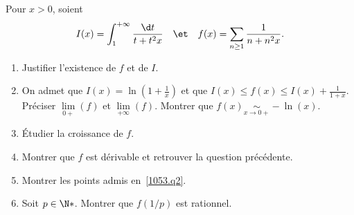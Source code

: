 \begin{enonce}
\begin{exercise}[ID={RMS125 E1053},subtitle={2014 CCP PC},tags={}]
    Pour $x>0$, soient 
    \begin{equation*}
    I(x)=\int_1^{+\infty} \frac{\d t}{t + t^2x}
    \quad\et\quad
    f(x)=\sum_{n\geq1} \frac{1}{n+n^2x}.  
    \end{equation*}
    \begin{enumerate}
      \item Justifier l'existence de $f$ et de $I$.
      \item\label{1053.q2}
        On admet que $I(x)=\ln\left( 1+\frac1x \right)$ et que $I(x)\leq f(x)\leq I(x)+ \frac{1}{1+x}$.\\
        Préciser $\lim\limits_{0+}(f)$ et $\lim\limits_{+\infty}(f)$.
        Montrer que $f(x)\underset{x\to0+}\sim -\ln(x)$.

      \item Étudier la croissance de $f$.
      \item Montrer que $f$ est dérivable et retrouver la question précédente.
      \item Montrer les points admis en~\ref{1053.q2}.
      \item Soit $p\in\N*$. Montrer que $f(1/p)$ est rationnel.
    \end{enumerate}
\end{exercise}
\begin{solution}
\end{solution}
\end{enonce}
